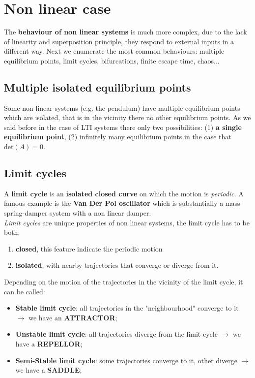 \section{Non linear case}
The \textbf{behaviour of non linear systems} is much more complex, due to the lack of linearity and superposition principle, they respond to external inputs in a different way. Next we enumerate the most common behaviours: multiple equilibrium points, limit cycles, bifurcations, finite escape time, chaos...

\subsection{Multiple isolated equilibrium points}
Some non linear systems (e.g. the pendulum) have multiple equilibrium points which are isolated, that is in the vicinity there no other equilibrium points. As we said before in the case of LTI systems there only two possibilities: (1) \textbf{a single equilibrium point}, (2) infinitely many equilibrium points in the case that $\textrm{det}(A)=0$.

\subsection{Limit cycles}
A \textbf{limit cycle} is an \textbf{isolated closed curve} on which the motion is \textit{periodic}. A famous example is the \textbf{Van Der Pol oscillator} which is substantially a mass-spring-damper system with a non linear damper.\\
\textit{Limit  cycles} are unique properties of non linear systems, the limit cycle has to be both:
\begin{enumerate}
    \item \textbf{closed}, this feature indicate the periodic motion
    \item \textbf{isolated}, with nearby trajectories that converge or diverge from it.
\end{enumerate}
Depending on the motion of the trajectories in the vicinity of the limit cycle, it can be called:
\begin{itemize}
    \item \textbf{Stable limit cycle}: all trajectories in the "neighbourhood" converge to it $\rightarrow$ we have an \textbf{ATTRACTOR}; 
    \item \textbf{Unstable limit cycle}: all trajectories diverge from the limit cycle $\rightarrow$ we have a \textbf{REPELLOR}; 
    \item \textbf{Semi-Stable limit cycle}: some trajectories converge to it, other diverge $\rightarrow$ we have a \textbf{SADDLE}; 
\end{itemize}

